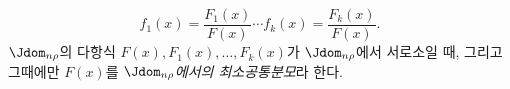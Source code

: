 
\[
f_1(x)=\frac{F_1(x)}{F(x)}\cdots f_k(x)=\frac{F_k(x)}{F(x)}.
\]
$\Jdom_{n\rho}$의 다항식 $F(x),F_1(x),\ldots,F_k(x)$가 $\Jdom_{n\rho}$에서 서로소일 때, 그리고 그때에만 $F(x)$를 \emph{$\Jdom_{n\rho}$에서의 최소공통분모}라 한다.
